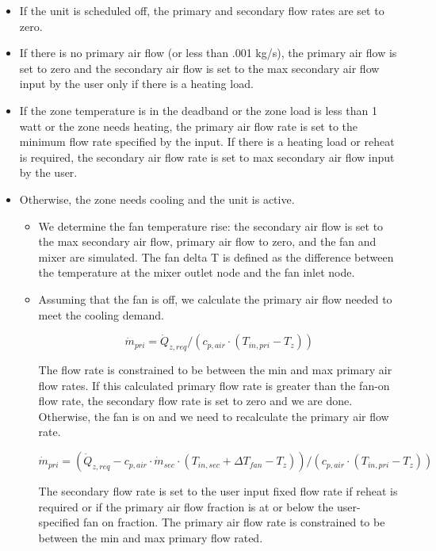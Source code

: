 \begin{itemize}
  \item
    If the unit is scheduled off, the primary and secondary flow rates are set to zero.
  \item
    If there is no primary air flow (or less than .001 kg/s), the primary air flow is set to zero and the secondary air flow is set to the max secondary air flow input by the user only if there is a heating load.
  \item
    If the zone temperature is in the deadband or the zone load is less than 1 watt or the zone needs heating, the primary air flow rate is set to the minimum flow rate specified by the input. If there is a heating load or reheat is required, the secondary air flow rate is set to max secondary air flow input by the user.
  \item
    Otherwise, the zone needs cooling and the unit is active.
  \begin{itemize}
    \item
      We determine the fan temperature rise: the secondary air flow is set to the max secondary air flow, primary air flow to zero, and the fan and mixer are simulated. The fan delta T is defined as the difference between the temperature at the mixer outlet node and the fan inlet node.
    \item
      Assuming that the fan is off, we calculate the primary air flow needed to meet the cooling demand.

\begin{equation}
  {\dot m_{pri}} = {\dot Q_{z,req}}/({c_{p,air}}\cdot ({T_{in,pri}} - {T_z}))
\end{equation}

The flow rate is constrained to be between the min and max primary air flow rates. If this calculated primary flow rate is greater than the fan-on flow rate, the secondary flow rate is set to zero and we are done. Otherwise, the fan is on and we need to recalculate the primary air flow rate.

\begin{equation}
  {\dot m_{pri}} = ({\dot Q_{z,req}} - {c_{p,air}}\cdot {\dot m_{sec}}\cdot ({T_{in,sec}} + \Delta {T_{fan}} - {T_z}))/({c_{p,air}}\cdot ({T_{in,pri}} - {T_z}))
\end{equation}

The secondary flow rate is set to the user input fixed flow rate if reheat is required or if the primary air flow fraction is at or below the user-specified fan on fraction. The primary air flow rate is constrained to be between the min and max primary flow rated.
  \end{itemize}
\end{itemize}

